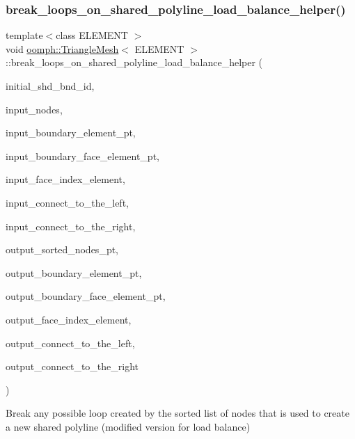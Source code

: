 \subsubsection{\texorpdfstring{break\+\_\+loops\+\_\+on\+\_\+shared\+\_\+polyline\+\_\+load\+\_\+balance\+\_\+helper()}{break\_loops\_on\_shared\_polyline\_load\_balance\_helper()}}
{\footnotesize\ttfamily template$<$class E\+L\+E\+M\+E\+NT $>$ \\
void \hyperlink{classoomph_1_1TriangleMesh}{oomph\+::\+Triangle\+Mesh}$<$ E\+L\+E\+M\+E\+NT $>$\+::break\+\_\+loops\+\_\+on\+\_\+shared\+\_\+polyline\+\_\+load\+\_\+balance\+\_\+helper (\begin{DoxyParamCaption}\item[{const unsigned \&}]{initial\+\_\+shd\+\_\+bnd\+\_\+id,  }\item[{std\+::list$<$ Node $\ast$$>$ \&}]{input\+\_\+nodes,  }\item[{Vector$<$ Finite\+Element $\ast$$>$ \&}]{input\+\_\+boundary\+\_\+element\+\_\+pt,  }\item[{Vector$<$ Finite\+Element $\ast$$>$ \&}]{input\+\_\+boundary\+\_\+face\+\_\+element\+\_\+pt,  }\item[{Vector$<$ int $>$ \&}]{input\+\_\+face\+\_\+index\+\_\+element,  }\item[{const int \&}]{input\+\_\+connect\+\_\+to\+\_\+the\+\_\+left,  }\item[{const int \&}]{input\+\_\+connect\+\_\+to\+\_\+the\+\_\+right,  }\item[{Vector$<$ std\+::list$<$ Node $\ast$$>$ $>$ \&}]{output\+\_\+sorted\+\_\+nodes\+\_\+pt,  }\item[{Vector$<$ Vector$<$ Finite\+Element $\ast$$>$ $>$ \&}]{output\+\_\+boundary\+\_\+element\+\_\+pt,  }\item[{Vector$<$ Vector$<$ Finite\+Element $\ast$$>$ $>$ \&}]{output\+\_\+boundary\+\_\+face\+\_\+element\+\_\+pt,  }\item[{Vector$<$ Vector$<$ int $>$ $>$ \&}]{output\+\_\+face\+\_\+index\+\_\+element,  }\item[{Vector$<$ int $>$ \&}]{output\+\_\+connect\+\_\+to\+\_\+the\+\_\+left,  }\item[{Vector$<$ int $>$ \&}]{output\+\_\+connect\+\_\+to\+\_\+the\+\_\+right }\end{DoxyParamCaption})\hspace{0.3cm}{\ttfamily [protected]}}



Break any possible loop created by the sorted list of nodes that is used to create a new shared polyline (modified version for load balance) 



